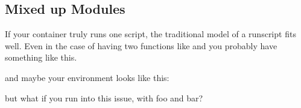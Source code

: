 \documentclass[letterpaper,10pt,english]{sphinxmanual}
\begin{document}
\subsection{Mixed up Modules}
\label{\detokenize{reproducible_scif_apps:mixed-up-modules}}
\begin{DUlineblock}{0em}
\item[] If your container truly runs one script, the traditional model of a
runscript fits well. Even in the case of having two functions like  and 
you probably have something like this.
\end{DUlineblock}

%
\begin{sphinxVerbatim}[commandchars=\\\{\}]

     

      

    

      

    
\end{sphinxVerbatim}

and maybe your environment looks like this:

%
\begin{sphinxVerbatim}[commandchars=\\\{\}]


     
\end{sphinxVerbatim}

\begin{DUlineblock}{0em}
\item[] but what if you run into this issue, with foo and bar?
\end{DUlineblock}

%
\begin{sphinxVerbatim}[commandchars=\\\{\}]



     
\end{sphinxVerbatim}
\end{document}
